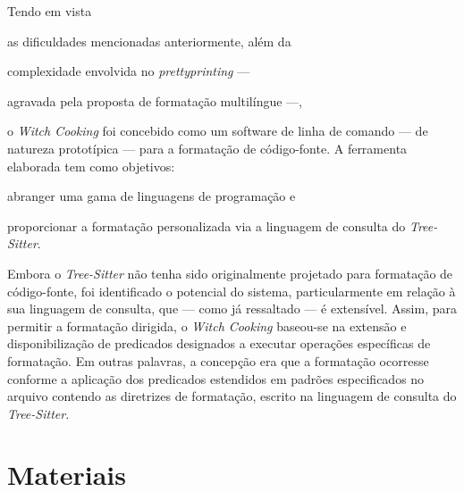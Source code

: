 \documentclass
  [11pt,a4paper,english,brazil,openright,sumario=tradicional,twoside]
  {abntex2}
\newcommand{\treesitter}{\textit{Tree-Sitter}\xspace}
\newcommand{\witchcooking}{\textit{Witch Cooking}\xspace}
\begin{document}
  Tendo em vista
  \begin{inparaenum}
    \item as dificuldades mencionadas anteriormente, além da
    \item complexidade envolvida no \textit{prettyprinting} ---
    \item agravada pela proposta de formatação multilíngue ---,
  \end{inparaenum}
  o \witchcooking foi concebido como um software de linha de comando --- de
  natureza prototípica --- para a formatação de código-fonte. A ferramenta
  elaborada tem como objetivos:
  \begin{inparaenum}
    \item abranger uma gama de linguagens de programação e
    \item proporcionar a formatação personalizada via a linguagem de consulta
          do \treesitter.
  \end{inparaenum}

  Embora o \treesitter não tenha sido originalmente projetado para formatação
  de código-fonte, foi identificado o potencial do sistema, particularmente em
  relação à sua linguagem de consulta, que --- como já ressaltado --- é
  extensível. Assim, para permitir a formatação dirigida, o \witchcooking
  baseou-se na extensão e disponibilização de predicados designados a executar
  operações específicas de formatação. Em outras palavras, a concepção era que
  a formatação ocorresse conforme a aplicação dos predicados estendidos em
  padrões especificados no arquivo contendo as diretrizes de formatação,
  escrito na linguagem de consulta do \treesitter.


  \section{Materiais}
\end{document}
